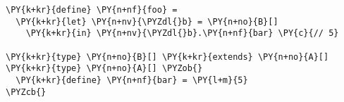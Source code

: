 \begin{Verbatim}[commandchars=\\\{\}]
\PY{k+kr}{define} \PY{n+nf}{foo} =
  \PY{k+kr}{let} \PY{n+nv}{\PYZdl{}b} = \PY{n+no}{B}[]
    \PY{k+kr}{in} \PY{n+nv}{\PYZdl{}b}.\PY{n+nf}{bar} \PY{c}{// 5}

\PY{k+kr}{type} \PY{n+no}{B}[] \PY{k+kr}{extends} \PY{n+no}{A}[]
\PY{k+kr}{type} \PY{n+no}{A}[] \PYZob{}
  \PY{k+kr}{define} \PY{n+nf}{bar} = \PY{l+m}{5}
\PYZcb{}
\end{Verbatim}

